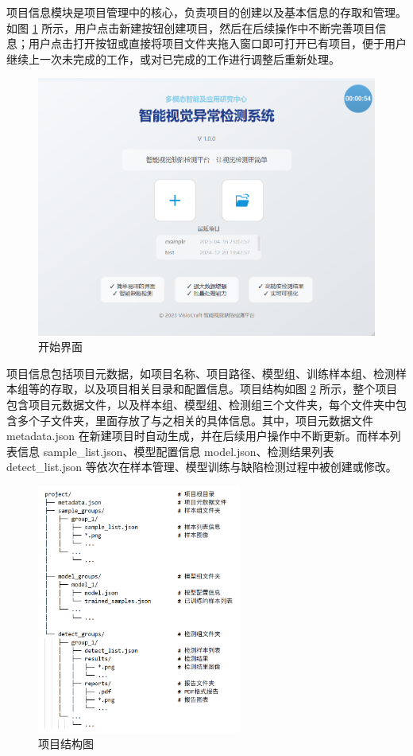 \documentclass[
  ]{njuthesis}
\begin{document}
项目信息模块是项目管理中的核心，负责项目的创建以及基本信息的存取和管理。如图 \ref{开始界面} 所示，用户点击新建按钮创建项目，然后在后续操作中不断完善项目信息；用户点击打开按钮或直接将项目文件夹拖入窗口即可打开已有项目，便于用户继续上一次未完成的工作，或对已完成的工作进行调整后重新处理。

\begin{figure}[htb]
    \centering
    \includegraphics[width=\textwidth]{images/开始界面.png}
    \caption{开始界面}
    \label{开始界面}
\end{figure}

项目信息包括项目元数据，如项目名称、项目路径、模型组、训练样本组、检测样本组等的存取，以及项目相关目录和配置信息。项目结构如图 \ref{项目结构图} 所示，整个项目包含项目元数据文件，以及样本组、模型组、检测组三个文件夹，每个文件夹中包含多个子文件夹，里面存放了与之相关的具体信息。其中，项目元数据文件 metadata.json 在新建项目时自动生成，并在后续用户操作中不断更新。而样本列表信息 sample\_list.json、模型配置信息 model.json、检测结果列表 detect\_list.json 等依次在样本管理、模型训练与缺陷检测过程中被创建或修改。

\begin{figure}[H]
    \centering
    \includegraphics[width=0.6\textwidth]{images/项目结构图.png}
    \caption{项目结构图}
    \label{项目结构图}
\end{figure}
\end{document}
